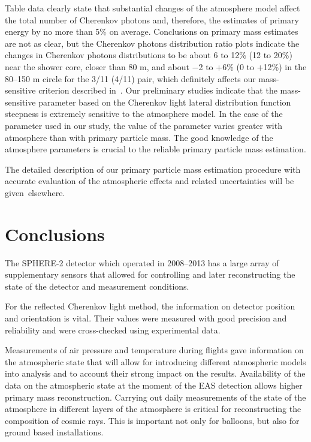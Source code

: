 \documentclass[universe,article,accept,moreauthors,pdftex]{Definitions/mdpi}
\begin{document}
Table data clearly state that substantial changes of the atmosphere model affect the total number of Cherenkov photons and, therefore, the estimates of primary energy by no more than 5\% on average. Conclusions on primary mass estimates are not as clear, but the Cherenkov photons distribution ratio plots indicate the changes in Cherenkov photons distributions to be about 6 to 12\% (12 to 20\%) near the shower core, closer than 80 m, and about $-$2 to +6\% (0 to +12\%) in the 80--150 m circle for the 3/11 (4/11) pair, which definitely affects our mass-sensitive criterion described in~\cite{Ant15c}. Our preliminary studies indicate that the mass-sensitive parameter based on the Cherenkov light lateral distribution function steepness is extremely sensitive to the atmosphere model. In the case of the parameter used in our study, the value of the parameter varies greater with atmosphere than with primary particle mass. The good knowledge of the atmosphere parameters is crucial to the reliable primary particle mass estimation.

The detailed description of our primary particle mass estimation procedure with accurate evaluation of the atmospheric effects and related uncertainties will be given~elsewhere. 



\section{Conclusions \label{sect:conclusions}}
The SPHERE-2 detector which operated in 2008--2013 has a large array of supplementary sensors that allowed for controlling and later reconstructing the state of the detector and measurement conditions. 

For the reflected Cherenkov light method, the information on detector position and orientation is vital. Their values were measured with good precision and reliability and were cross-checked using experimental data.

Measurements of air pressure and temperature during flights gave information on the atmospheric state that will allow for introducing different atmospheric models into analysis and to account their strong impact on the results. Availability of the data on the atmospheric state at the moment of the EAS detection allows higher primary mass reconstruction. Carrying out daily measurements of the state of the atmosphere in different layers of the atmosphere is critical for reconstructing the composition of cosmic rays. This is important not only for balloons, but also for ground based installations.
\end{document}
